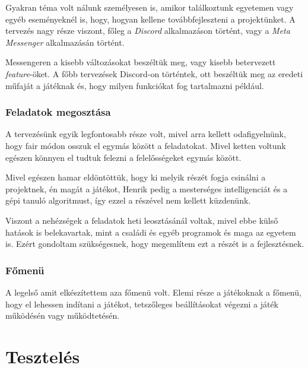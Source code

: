 \documentclass[]{thesis-ekf}
\theoremstyle{definition}
\begin{document}
	Gyakran téma volt nálunk személyesen is, amikor találkoztunk egyetemen vagy egyéb eseményeknél is, hogy, hogyan kellene továbbfejleszteni a projektünket. A tervezés nagy része viszont, főleg a \emph{Discord} alkalmazáson történt, vagy a \emph{Meta Messenger} alkalmazásán történt.
	
	Messengeren a kisebb változásokat beszéltük meg, vagy kisebb betervezett \emph{feature}-öket. A főbb tervezések Discord-on történtek, ott beszéltük meg az eredeti műfaját a játéknak és, hogy milyen funkciókat fog tartalmazni például.
	
	\subsection{Feladatok megosztása}
	A tervezésünk egyik legfontosabb része volt, mivel arra kellett odafigyelnünk, hogy fair módon osszuk el egymás között a feladatokat. Mivel ketten voltunk egészen könnyen el tudtuk felezni a felelősségeket egymás között.
	
	Mivel egészen hamar eldöntöttük, hogy ki melyik részét fogja csinálni a projektnek, én magát a játékot, Henrik pedig a mesterséges intelligenciát és a gépi tanuló algoritmust, így ezzel a részével nem kellett küzdenünk.
	
	Viszont a nehézségek a feladatok heti leosztásánál voltak, mivel ebbe külső hatások is belekavartak, mint a családi és egyéb programok és maga az egyetem is. Ezért gondoltam szükségesnek, hogy megemlítem ezt a részét is a fejlesztésnek.
	
	\subsection{Főmenü}
	A legelső amit elkészítettem aza főmenü volt. Elemi része a játékoknak a főmenü, hogy el lehessen indítani a játékot, tetszőleges beállításokat végezni a játék működésén vagy működtetésén.
	
	\chapter{Tesztelés}
	
\end{document}
